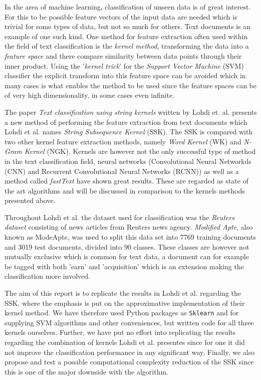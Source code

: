
In the area of machine learning, classification of unseen data is of great interest. For this to be possible feature vectors of the input data are needed which is trivial for some types of data, but not so much for others. Text documents is an example of one such kind. One method for feature extraction often used within the field of text classification is the \textit{kernel method}, transforming the data into a \textit{feature space} and there compare similarity between data points through their inner product. Using the '\textit{kernel trick}' for the \textit{Support Vector Machine} (SVM) classifier the explicit transform into this feature space can be avoided which in many cases is what enables the method to be used since the feature spaces can be of very high dimensionality, in some cases even infinite. 

The paper \textit{Text classification using string kernels} written by Lohdi et. al. presents a new method of performing the feature extraction from text documents which Lohdi et al. names \textit{String Subsequence Kernel} (SSK). The SSK is compared with two other kernel feature extraction methods, namely \textit{Word Kernel} (WK) and \textit{N-Gram Kernel} (NGK). Kernels are however not the only successful type of method in the text classification field, neural networks (Convolutional Neural Networkds (CNN) and Recurrent Convolutional Neural Networks (RCNN)) as well as a method called \textit{fastText} have shown great results. These are regarded as state of the art algorithms and will be discussed in comparison to the kernels methods presented above. 

Throughout Lohdi et al. the dataset used for classification was the \textit{Reuters dataset} consisting of news articles from Reuters news agency. \textit{Modified Apte}, also known as ModeApte, was used to split this data set into 7769 training documents and 3019 test documents, divided into 90 classes. These classes are however not mutually exclusive which is common for text data, a document can for example be tagged with both 'earn' and 'acquisition' which is an extension making the classification more involved.

The aim of this report is to replicate the results in Lohdi et al. regarding the SSK, where the emphasis is put on the approximative implementation of their kernel method. We have therefore used Python packages as \texttt{Sklearn} and  for supplying SVM algorithms and other conveniences, but written code for all three kernels ourselves. Further, we have put no effort into replicating the results regarding the combination of kernels Lohdi et al. presentes since for one it did not improve the classification performance in any significant way. Finally, we also propose and test a possible computational complexity reduction of the SSK since this is one of the major downside with the algorithm.

